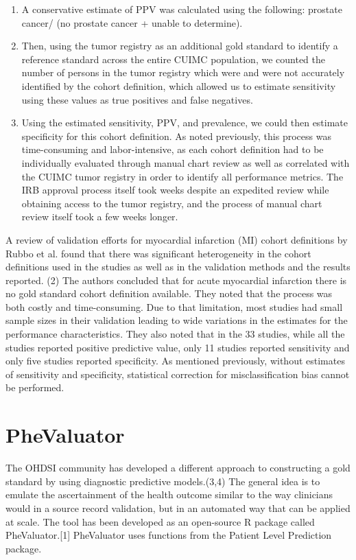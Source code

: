 \documentclass[
  letterpaper,
  paper=7in:10in,
  pagesize=pdftex,
  headinclude=on,
  footinclude=on,
  12pt]{scrbook}
\begin{document}
\begin{enumerate}
  3) unable to determine.
\item
  A conservative estimate of PPV was calculated using the following:
  prostate cancer/ (no prostate cancer + unable to determine).
\item
  Then, using the tumor registry as an additional gold standard to
  identify a reference standard across the entire CUIMC population, we
  counted the number of persons in the tumor registry which were and
  were not accurately identified by the cohort definition, which allowed
  us to estimate sensitivity using these values as true positives and
  false negatives.
\item
  Using the estimated sensitivity, PPV, and prevalence, we could then
  estimate specificity for this cohort definition. As noted previously,
  this process was time-consuming and labor-intensive, as each cohort
  definition had to be individually evaluated through manual chart
  review as well as correlated with the CUIMC tumor registry in order to
  identify all performance metrics. The IRB approval process itself took
  weeks despite an expedited review while obtaining access to the tumor
  registry, and the process of manual chart review itself took a few
  weeks longer.
\end{enumerate}

A review of validation efforts for myocardial infarction (MI) cohort
definitions by Rubbo et al. found that there was significant
heterogeneity in the cohort definitions used in the studies as well as
in the validation methods and the results reported. (2) The authors
concluded that for acute myocardial infarction there is no gold standard
cohort definition available. They noted that the process was both costly
and time-consuming. Due to that limitation, most studies had small
sample sizes in their validation leading to wide variations in the
estimates for the performance characteristics. They also noted that in
the 33 studies, while all the studies reported positive predictive
value, only 11 studies reported sensitivity and only five studies
reported specificity. As mentioned previously, without estimates of
sensitivity and specificity, statistical correction for
misclassification bias cannot be performed.

\section{PheValuator}\label{phevaluator}

The OHDSI community has developed a different approach to constructing a
gold standard by using diagnostic predictive models.(3,4) The general
idea is to emulate the ascertainment of the health outcome similar to
the way clinicians would in a source record validation, but in an
automated way that can be applied at scale. The tool has been developed
as an open-source R package called PheValuator.{[}1{]} PheValuator uses
functions from the Patient Level Prediction package.
\end{document}
